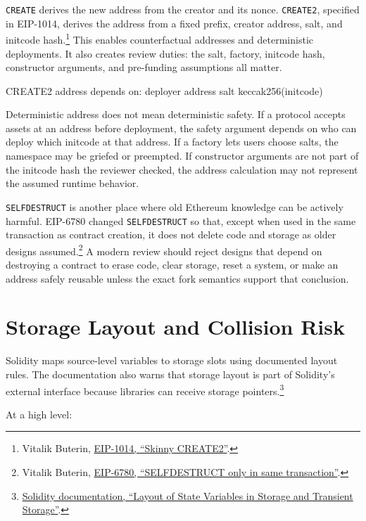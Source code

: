 \texttt{CREATE} derives the new address from the creator and its nonce. \texttt{CREATE2}, specified in EIP-1014, derives the address from a fixed prefix, creator address, salt, and initcode hash.\footnote{Vitalik Buterin, \href{https://eips.ethereum.org/EIPS/eip-1014}{EIP-1014, ``Skinny CREATE2''}.} This enables counterfactual addresses and deterministic deployments. It also creates review duties: the salt, factory, initcode hash, constructor arguments, and pre-funding assumptions all matter.

\begin{codeblock}
CREATE2 address depends on:
    deployer address
    salt
    keccak256(initcode)
\end{codeblock}

Deterministic address does not mean deterministic safety. If a protocol accepts assets at an address before deployment, the safety argument depends on who can deploy which initcode at that address. If a factory lets users choose salts, the namespace may be griefed or preempted. If constructor arguments are not part of the initcode hash the reviewer checked, the address calculation may not represent the assumed runtime behavior.

\texttt{SELFDESTRUCT} is another place where old Ethereum knowledge can be actively harmful. EIP-6780 changed \texttt{SELFDESTRUCT} so that, except when used in the same transaction as contract creation, it does not delete code and storage as older designs assumed.\footnote{Vitalik Buterin, \href{https://eips.ethereum.org/EIPS/eip-6780}{EIP-6780, ``SELFDESTRUCT only in same transaction''}.} A modern review should reject designs that depend on destroying a contract to erase code, clear storage, reset a system, or make an address safely reusable unless the exact fork semantics support that conclusion.

\section{Storage Layout and Collision Risk}

Solidity maps source-level variables to storage slots using documented layout rules. The documentation also warns that storage layout is part of Solidity's external interface because libraries can receive storage pointers.\footnote{\href{https://docs.soliditylang.org/en/latest/internals/layout_in_storage.html}{Solidity documentation, ``Layout of State Variables in Storage and Transient Storage''}.}

At a high level:

